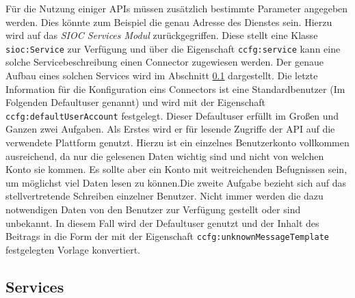 Für die Nutzung einiger APIs müssen zusätzlich bestimmte Parameter angegeben werden. Dies könnte zum Beispiel die genau Adresse des Dienstes sein. Hierzu wird auf das \emph{SIOC Services Modul} zurückgegriffen. Diese stellt eine Klasse \texttt{sioc:Service} zur Verfügung und über die Eigenschaft \texttt{ccfg:service} kann eine solche Servicebeschreibung einen Connector zugewiesen werden. Der genaue Aufbau eines solchen Services wird im Abschnitt \ref{sub:services} dargestellt. Die letzte Information für die Konfiguration eins Connectors ist eine Standardbenutzer (Im Folgenden Defaultuser genannt) und wird mit der Eigenschaft \texttt{ccfg:defaultUserAccount} festgelegt. Dieser Defaultuser erfüllt im Großen und Ganzen zwei Aufgaben. Als Erstes wird er für lesende Zugriffe der API auf die verwendete Plattform genutzt. Hierzu ist ein einzelnes Benutzerkonto vollkommen ausreichend, da nur die gelesenen Daten wichtig sind und nicht von welchen Konto sie kommen. Es sollte aber ein Konto mit weitreichenden Befugnissen sein, um möglichst viel Daten lesen zu können.Die zweite Aufgabe bezieht sich auf das stellvertretende Schreiben einzelner Benutzer. Nicht immer werden die dazu notwendigen Daten von den Benutzer zur Verfügung gestellt oder sind unbekannt. In diesem Fall wird der Defaultuser genutzt und der Inhalt des Beitrags in die Form der mit der Eigenschaft \texttt{\texttt{ccfg:unknownMessageTemplate}} festgelegten Vorlage konvertiert. 


\subsection{Services} %
\label{sub:services}

